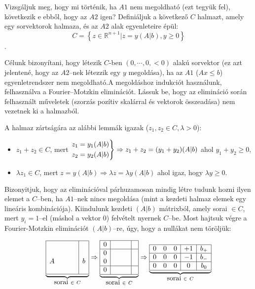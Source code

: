 Vizsgáljuk meg, hogy mi történik, ha $A1$ nem megoldható (ezt tegyük fel),
következik e ebből, hogy az $A2$ igen? Definiáljuk a következő $C$ halmazt,
amely egy sorvektorok halmaza, és az $A2$ alak egyenleteire épül: \[ C= \left\{
z \in \mathbb{R}^{n+1} | z = y (A|b), y \geq 0 \right\}\].

Célunk bizonyítani, hogy létezik $C$-ben $(0, \cdots, 0 , <0)$ alakú sorvektor
(ez azt jelentené, hogy az $A2$--nek létezzik egy $y$ megoldása), ha az $A1$
($Ax \leq b$) egyenletrendszer nem megoldható.A megoldáshoz indukciót
használunk, felhasználva a Fourier--Motzkin eliminációt. Lássuk be, hogy az
elimináció során felhasznált műveletek (szorzás pozítiv skalárral és vektorok
összeadása) nem vezetnek ki a halmazból.

A halmaz zártságára az alábbi lemmák igazak ($z_1, z_2 \in C, \lambda>0$):

\begin{itemize}
  \item $z_1+z_2 \in C$, mert $\begin{rcases}
  z_1=y_1(A|b) \\
  z_2=y_2(A|b) \end{rcases} \Rightarrow z_1+z_2=(y_1+y_2)(A|b)$ ahol $y_1+y_2 \geq 0,$
  \item $\lambda z_1 \in C$, mert $
  z=y(A|b) \Rightarrow \lambda z = \lambda y (A|b)$ ahol igaz, hogy $\lambda y \geq 0$.
\end{itemize}

Bizonyitjuk, hogy az eliminációval párhuzamosan mindig létre tudunk hozni ilyen
elemet a $C$--ben, ha $A1$--nek nincs megoldása (mint a kezdeti halmaz elemek
egy lineáris kombinációja). Kiindulunk kezdeti $(A|b)$ mátrixból, amely sorai
$\in C$, mert $y_i=1$--el (máshol a vektor $0$) felvételt nyernek $C$--be. Most
hajtsuk végre a Fourier-Motzkin eliminációt $(A|b)$--re, úgy, hogy a nullákat
nem töröljük:

\begin{displaymath}
\underbrace{
\begin{array}{|cccc|c|}
\hline
 &  &  &  & \\
 &  & &  & \\
A &  & &  &b \\
 &  & & &\\
\hline
\end{array}}_{\mbox{sorai } \in~C}
\Rightarrow
\underbrace{
\begin{array}{|c|ccc|c|}
\hline
0 &  &  &  & \\
\hline
0 &  & &  & \\
0 &  & &  & \\
\hline
0 &  & & &\\
\hline
\end{array}}_{\mbox{sorai } \in~C}
\Rightarrow
\underbrace{
\begin{array}{|ccc|c|c|}
\hline
0 &  0 &0  & +1  & b_+\\
\hline
0 &  0& 0&  -1& b_-\\
\hline
0 &  0& 0& 0& b_0\\
\hline
\end{array}}_{\mbox{sorai } \in~C}
\end{displaymath}


